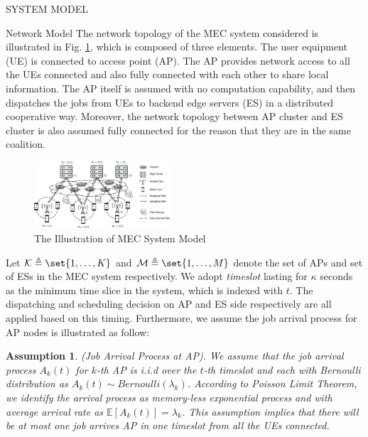 \documentclass[10pt, conference, letterpaper]{IEEEtran}
\newtheorem{assumption}{Assumption}
\DeclarePairedDelimiter\set\{\}
\begin{document}
    \begin{section}{SYSTEM MODEL}
        \label{sec:model}
        \begin{subsection}{Network Model}
            The network topology of the MEC system considered is illustrated in Fig. \ref{fig:system}, which is composed of three elements. The user equipment (UE) is connected to access point (AP). The AP provides network access to all the UEs connected and also fully connected with each other to share local information. The AP itself is assumed with no computation capability, and then dispatches the jobs from UEs to backend edge servers (ES) in a distributed cooperative way. Moreover, the network topology between AP cluster and ES cluster is also assumed fully connected for the reason that they are in the same coalition.
            \begin{figure}[ht]
                \centering
                \includegraphics[width=0.45\textwidth, trim={0.5cm 0.5cm 0.5cm 0.5cm}, clip]{system-model.pdf}
                \caption{The Illustration of MEC System Model}
                \label{fig:system}
            \end{figure}

            Let $\mathcal{K} \triangleq \set{1,\dots,K}$ and $\mathcal{M} \triangleq \set{1,\dots,M}$ denote the set of APs and set of ESs in the MEC system respectively. We adopt \emph{timeslot} lasting for $\kappa$ seconds as the minimum time slice in the system, which is indexed with $t$. The dispatching and scheduling decision on AP and ES side respectively are all applied based on this timing. Furthermore, we assume the job arrival process for AP nodes is illustrated as follow:
            \begin{assumption}
                (Job Arrival Process at AP).
                We assume that the job arrival process $A_k(t)$ for $k$-th AP is i.i.d over the $t$-th timeslot and each with Bernoulli distribution as $A_k(t) \sim Bernoulli(\lambda_k)$.  According to Poisson Limit Theorem, we identify the arrival process as memory-less exponential process and with average arrival rate as $\mathbb{E}[A_k(t)] = \lambda_k$.
                This assumption implies that there will be at most one job arrives AP in one timeslot from all the UEs connected.
            \end{assumption}


\end{subsection}
\end{section}
\end{document}
